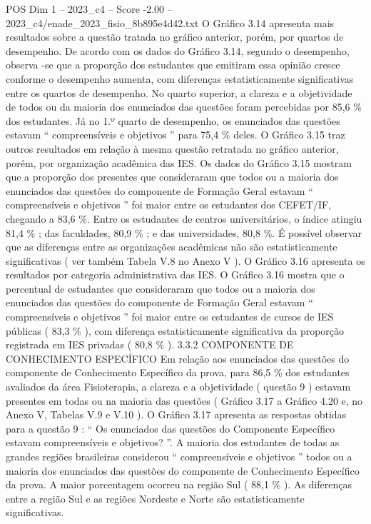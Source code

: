 \begin{textsample}{POS Dim 1 – 2023\_c4 – Score -2.00 – 2023\_c4/enade\_2023\_fisio\_8b895e4d42.txt}
O Gráfico 3.14 apresenta mais resultados sobre a questão tratada no gráfico anterior, porém, por quartos de desempenho.
De acordo com os dados do Gráfico 3.14, segundo o desempenho, observa -se que a proporção dos estudantes que emitiram essa opinião cresce conforme o desempenho aumenta, com diferenças estatisticamente significativas entre os quartos de desempenho.
No quarto superior, a clareza e a objetividade de todos ou da maioria dos enunciados das questões foram percebidas por 85,6 \% dos estudantes.
Já no 1.º quarto de desempenho, os enunciados das questões estavam “ compreensíveis e objetivos ” para 75,4 \% deles.
O Gráfico 3.15 traz outros resultados em relação à mesma questão retratada no gráfico anterior, porém, por organização acadêmica das IES.
Os dados do Gráfico 3.15 mostram que a proporção dos presentes que consideraram que todos ou a maioria dos enunciados das questões do componente de Formação Geral estavam “ compreensíveis e objetivos ” foi maior entre os estudantes dos CEFET/IF, chegando a 83,6 \%.
Entre os estudantes de centros universitários, o índice atingiu 81,4 \% ; das faculdades, 80,9 \% ; e das universidades, 80,8 \%.
É possível observar que as diferenças entre as organizações acadêmicas não são estatisticamente significativas ( ver também Tabela V.8 no Anexo V ).
O Gráfico 3.16 apresenta os resultados por categoria administrativa das IES.
O Gráfico 3.16 mostra que o percentual de estudantes que consideraram que todos ou a maioria dos enunciados das questões do componente de Formação Geral estavam “ compreensíveis e objetivos ” foi maior entre os estudantes de cursos de IES públicas ( 83,3 \% ), com diferença estatisticamente significativa da proporção registrada em IES privadas ( 80,8 \% ). 3.3.2 COMPONENTE DE CONHECIMENTO ESPECÍFICO Em relação aos enunciados das questões do componente de Conhecimento Específico da prova, para 86,5 \% dos estudantes avaliados da área Fisioterapia, a clareza e a objetividade ( questão 9 ) estavam presentes em todas ou na maioria das questões ( Gráfico 3.17 a Gráfico 4.20 e, no Anexo V, Tabelas V.9 e V.10 ).
O Gráfico 3.17 apresenta as respostas obtidas para a questão 9 : “ Os enunciados das questões do Componente Específico estavam compreensíveis e objetivos? ”.
A maioria dos estudantes de todas as grandes regiões brasileiras considerou “ compreensíveis e objetivos ” todos ou a maioria dos enunciados das questões do componente de Conhecimento Específico da prova.
A maior porcentagem ocorreu na região Sul ( 88,1 \% ).
As diferenças entre a região Sul e as regiões Nordeste e Norte são estatisticamente significativas.

\end{textsample}
